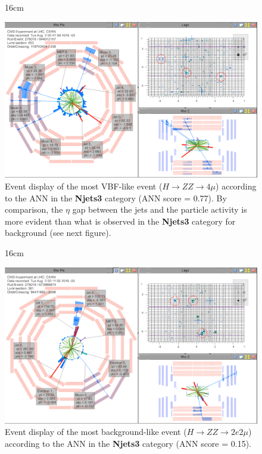 \begin{figure}[H!]{16cm}
	\caption{Event display of the most VBF-like event ($H \rightarrow ZZ \rightarrow 4\mu$) according to the ANN in the \textbf{Njets3} category (ANN score = 0.77). By comparison, the $\eta$ gap between the jets and the particle activity is more evident than what is observed in the \textbf{Njets3} category for background (see next figure).}
	\includegraphics[scale=0.7,angle=90]{ChapterAnalysis/figs/event_display_Run278018_Lumi453_Event844012107_Njets3_ANN0p77_DoubleMuon_Run2016F_2}
\end{figure}

\begin{figure}[H!]{16cm}
	\caption{Event display of the most background-like event ($H \rightarrow ZZ \rightarrow 2e2\mu$) according to the ANN in the \textbf{Njets3} category (ANN score = 0.15).}
	\includegraphics[scale=0.7,angle=90]{ChapterAnalysis/figs/event_display_Run278018_Lumi361_Event673988874_Njets3_ANN0p04_DoubleEG_Run2016F_2}
\end{figure}
	